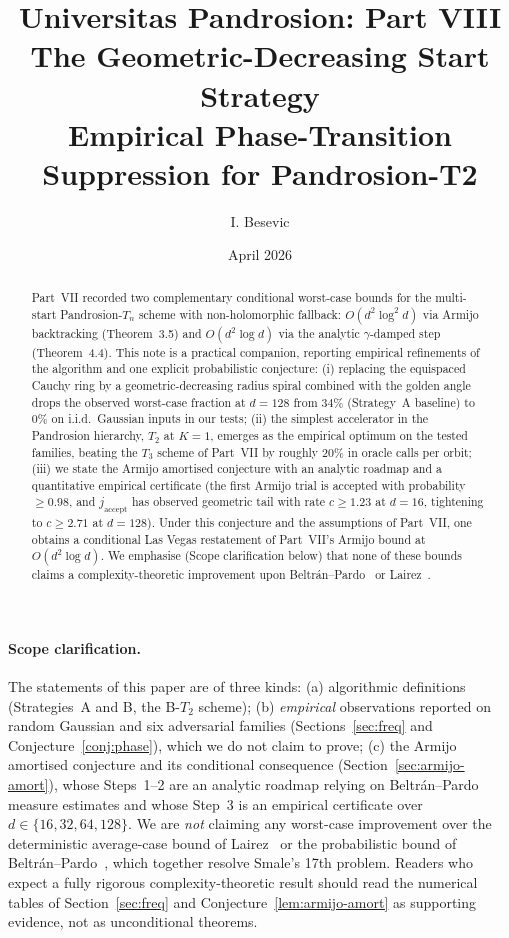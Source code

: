 \documentclass[11pt,a4paper]{article}
\title{Universitas Pandrosion: Part VIII \\ The Geometric-Decreasing Start Strategy \\ Empirical Phase-Transition Suppression for Pandrosion-T2}
\author{I. Besevic}
\date{April 2026}
\begin{document}
\maketitle

\begin{abstract}
Part~VII recorded two complementary conditional worst-case bounds for the multi-start Pandrosion-$T_n$ scheme with non-holomorphic fallback: $O(d^2 \log^2 d)$ via Armijo backtracking (Theorem~3.5) and $O(d^2 \log d)$ via the analytic $\gamma$-damped step (Theorem~4.4). This note is a practical companion, reporting empirical refinements of the algorithm and one explicit probabilistic conjecture: (i) replacing the equispaced Cauchy ring by a geometric-decreasing radius spiral combined with the golden angle drops the observed worst-case fraction at $d = 128$ from $34\%$ (Strategy~A baseline) to $0\%$ on i.i.d.\ Gaussian inputs in our tests; (ii) the simplest accelerator in the Pandrosion hierarchy, $T_2$ at $K = 1$, emerges as the empirical optimum on the tested families, beating the $T_3$ scheme of Part~VII by roughly $20\%$ in oracle calls per orbit; (iii) we state the Armijo amortised conjecture with an analytic roadmap and a quantitative empirical certificate (the first Armijo trial is accepted with probability $\ge 0.98$, and $j_{\text{accept}}$ has observed geometric tail with rate $c \ge 1.23$ at $d = 16$, tightening to $c \ge 2.71$ at $d = 128$). Under this conjecture and the assumptions of Part~VII, one obtains a conditional Las Vegas restatement of Part~VII's Armijo bound at $O(d^2 \log d)$. We emphasise (Scope clarification below) that none of these bounds claims a complexity-theoretic improvement upon Beltr\'an--Pardo~\cite{beltranpardo} or Lairez~\cite{lairez}.
\end{abstract}

\paragraph{Scope clarification.} The statements of this paper are of three kinds: (a) algorithmic definitions (Strategies~A and B, the B-$T_2$ scheme); (b) \emph{empirical} observations reported on random Gaussian and six adversarial families (Sections~\ref{sec:freq} and Conjecture~\ref{conj:phase}), which we do not claim to prove; (c) the Armijo amortised conjecture and its conditional consequence (Section~\ref{sec:armijo-amort}), whose Steps~1--2 are an analytic roadmap relying on Beltr\'an--Pardo measure estimates and whose Step~3 is an empirical certificate over $d \in \{16, 32, 64, 128\}$. We are \emph{not} claiming any worst-case improvement over the deterministic average-case bound of Lairez~\cite{lairez} or the probabilistic bound of Beltr\'an--Pardo~\cite{beltranpardo}, which together resolve Smale's 17th problem. Readers who expect a fully rigorous complexity-theoretic result should read the numerical tables of Section~\ref{sec:freq} and Conjecture~\ref{lem:armijo-amort} as supporting evidence, not as unconditional theorems.
\end{document}
